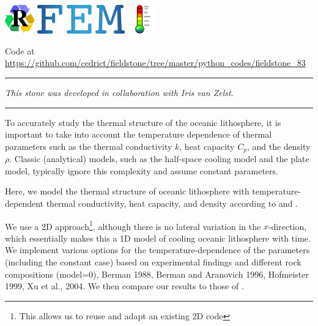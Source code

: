 \includegraphics[height=1.25cm]{images/pictograms/replication}
\includegraphics[height=1.25cm]{images/pictograms/FEM}
\includegraphics[height=1.25cm]{images/pictograms/temperature}




\begin{center}
Code at \url{https://github.com/cedrict/fieldstone/tree/master/python_codes/fieldstone_83}
\end{center}

\par\noindent\rule{\textwidth}{0.4pt}

{\sl This stone was developed in collaboration with Iris van Zelst}. 

\par\noindent\rule{\textwidth}{0.4pt}


To accurately study the thermal structure of the oceanic lithosphere, it is important to take 
into account the temperature dependence of thermal parameters such as the thermal conductivity $k$, 
heat capacity $C_p$, and the density $\rho$. Classic (analytical) models, such as the half-space 
cooling model and the plate model, typically ignore this complexity and assume constant parameters.
 
Here, we model the thermal structure of oceanic lithosphere with temperature-dependent 
thermal conductivity, heat capacity, and density according to \textcite{mcjp05} 
and \textcite{rihc18}. 

We use a 2D approach\footnote{This allows us to reuse and adapt an existing 2D code}, 
although there is no lateral variation in the $x$-direction, 
which essentially makes this a 1D model of cooling oceanic lithosphere with time. 
We implement various options for the temperature-dependence of the parameters (including the constant case) 
based on experimental findings and different rock compositions \textcite{pasc77} ({\python model=0}), 
Berman 1988, Berman and Aranovich 1996, Hofmeister 1999, Xu et al., 2004. 
We then compare our results to those of \textcite{rihc18}.


